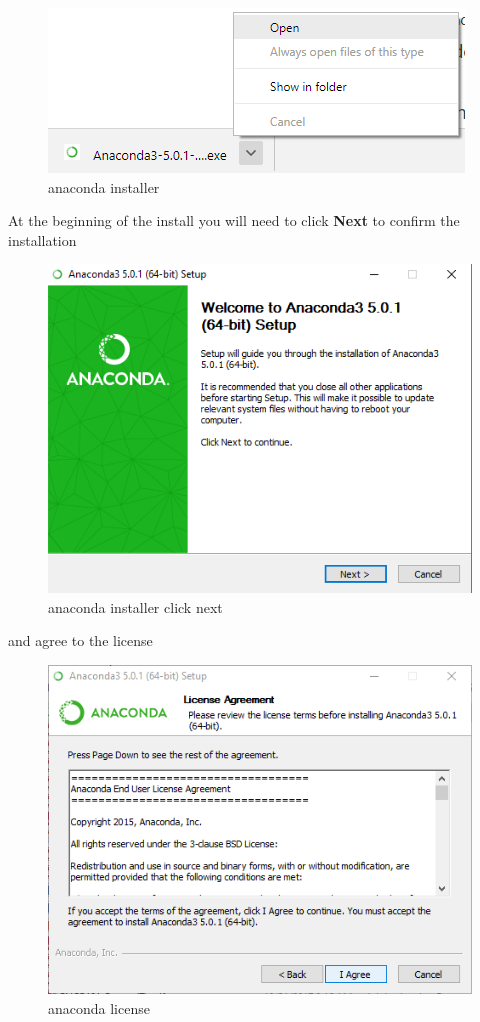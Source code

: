 \documentclass{book}
\makeatletter
\def\maxwidth{\ifdim\Gin@nat@width>\linewidth\linewidth
    \else\Gin@nat@width\fi}
\let\Oldincludegraphics\includegraphics
\renewcommand{\includegraphics}[1]{\Oldincludegraphics[width=.8\maxwidth]{#1}}
\makeatother
\begin{document}
\begin{figure}
\centering
\includegraphics{images/anaconda_run_installer.png}
\caption{anaconda installer}
\end{figure}

At the beginning of the install you will need to click \textbf{Next} to
confirm the installation

\begin{figure}
\centering
\includegraphics{images/anaconda_installer_click_next.png}
\caption{anaconda installer click next}
\end{figure}

and agree to the license

\begin{figure}
\centering
\includegraphics{images/anaconda_agree_to_license.png}
\caption{anaconda license}
\end{figure}
\end{document}
